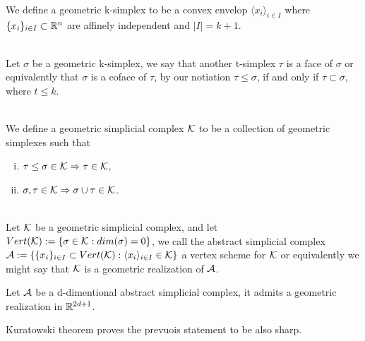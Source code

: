 \documentclass[../1.tex]{subfiles}
\begin{document}
    \begin{defn}
        \\
        We define a geometric k-simplex to be a convex envelop $\langle x_i \rangle_{i \in I}$
        where $\{x_i\}_{i \in I} \subset \mathbb{R}^n$ are affinely independent and $|I| = k + 1$.
    \end{defn}
    \begin{defn}
        \\
        Let $\sigma$ be a geometric k-simplex, we say that another t-simplex $\tau$ is a face of $\sigma$ or equivalently 
        that $\sigma$ is a coface of $\tau$, by our notiation $\tau \leq \sigma$, if and only if $\tau \subset \sigma$, where $t \leq k$.
    \end{defn}
    \begin{defn}
        \\
        We define a geometric simplicial complex $\mathcal{K}$ to be a collection of geometric simplexes such that
        \begin{enumerate}[(i)]
            \item $ \tau \leq \sigma \in \mathcal{K} \Rightarrow \tau \in \mathcal{K} $,
            \item $ \sigma, \tau \in \mathcal{K} \Rightarrow \sigma \cup \tau \in \mathcal{K}  $.
        \end{enumerate}
    \end{defn}
    \newpage
    \begin{defn}
        \\
        Let $\mathcal{K}$ be a geometric simplicial complex, and let $Vert(\mathcal{K}) := \{\sigma \in \mathcal{K} : dim(\sigma) = 0\}$, we call
        the abstract simplicial complex $\mathcal{A} := \{ \{x_i\}_{i \in I} \subset Vert(\mathcal{K}) : \langle x_i \rangle_{i \in I} \in \mathcal{K} \}$
        a vertex scheme for $\mathcal{K}$ or equivalently we might say that $\mathcal{K}$ is a geometric realization of $\mathcal{A}$.
    \end{defn}
    \begin{thm}
        Let $\mathcal{A}$ be a d-dimentional abstract simplicial complex, it admits a geometric realization in $\mathbb{R}^{2d+1}$.
    \end{thm}
    Kuratowski theorem proves the prevuois statement to be also sharp.
\end{document}
